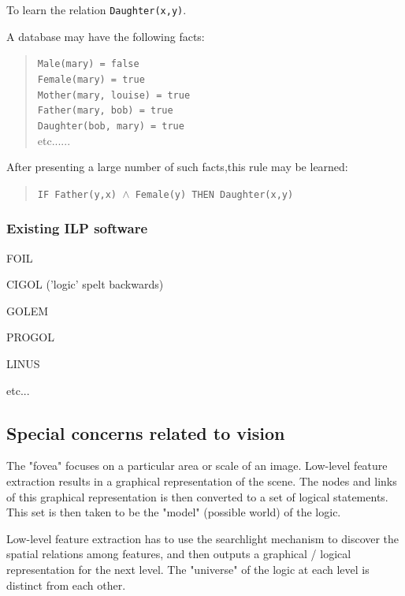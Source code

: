 To learn the relation \texttt{Daughter(x,y)}.

A database may have the following facts:
\begin{quote}

\texttt{Male(mary) = false
\\
    Female(mary) = true
\\
    Mother(mary, louise) = true
\\
    Father(mary, bob) = true
\\
    Daughter(bob, mary) = true
\\}etc......
\end{quote}

After presenting a large number of such facts,this rule may be learned:
\begin{quote}

\texttt{IF Father(y,x) $\wedge$ Female(y) THEN Daughter(x,y)}
\end{quote}

\subsubsection{Existing ILP software}
\begin{compactenum}
	\item FOIL
	\item  CIGOL ('logic' spelt backwards)
	\item GOLEM
	\item  PROGOL
	\item LINUS
	\item etc...
\end{compactenum}

\subsection{Special concerns related to vision}

The "fovea" focuses on a particular area or scale of an image. Low-level feature extraction results in a graphical representation of the scene. The nodes and links of this graphical representation is then converted to a set of logical statements. This set is then taken to be the "model" (possible world) of the logic.

Low-level feature extraction has to use the searchlight mechanism to discover the spatial relations among features, and then outputs a graphical / logical representation for the next level. The "universe" of the logic at each level is distinct from each other.

